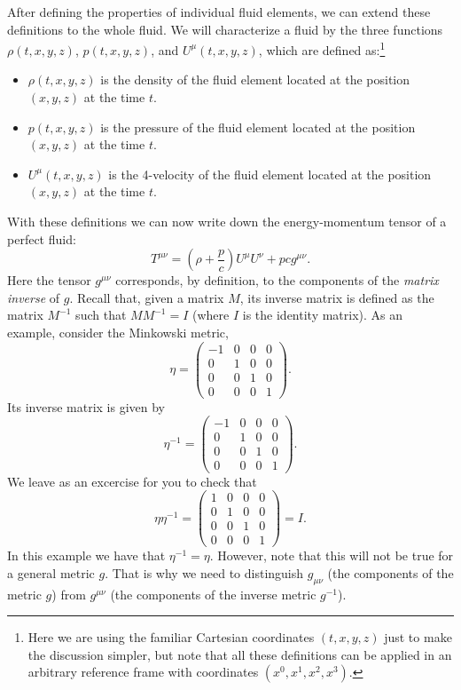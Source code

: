 After defining the properties of individual fluid elements, we can extend these definitions to the whole fluid. We will characterize a fluid by the three functions $\rho(t,x,y,z)$, $p(t,x,y,z)$, and $U^{\mu}(t,x,y,z)$, which are defined as:\footnote{Here we are using the familiar Cartesian coordinates $(t,x,y,z)$ just to make the discussion simpler, but note that all these definitions can be applied in an arbitrary reference frame with coordinates $(x^0,x^1,x^2,x^3)$.}
\begin{itemize}
\item $\rho(t,x,y,z)$ is the density of the fluid element located at the position $(x,y,z)$ at the time $t$.
\item $p(t,x,y,z)$ is the pressure of the fluid element located at the position $(x,y,z)$ at the time $t$.
\item $U^{\mu}(t,x,y,z)$ is the 4-velocity of the fluid element located at the position $(x,y,z)$ at the time $t$.
\end{itemize}
With these definitions we can now write down the energy-momentum tensor of a perfect fluid:
\begin{equation} \label{eq:perfect_fluid_tmunu}
T^{\mu\nu}=\left(\rho+\frac{p}{c}\right)U^{\mu}U^{\nu}+pcg^{\mu\nu}.
\end{equation}
Here the tensor $g^{\mu\nu}$ corresponds, by definition, to the components of the {\it matrix inverse} of $g$. Recall that, given a matrix $M$, its inverse matrix is defined as the matrix $M^{-1}$ such that $MM^{-1}=I$ (where $I$ is the identity matrix). As an example, consider the Minkowski metric,
\begin{equation}
\eta=\left( \begin{array}{cccc} -1 & 0 & 0 & 0 \\ 
0 & 1 & 0 & 0 \\
0 & 0 & 1 & 0 \\
0 & 0 & 0 & 1\end{array} \right).
\end{equation}
Its inverse matrix is given by
\begin{equation}
\eta^{-1}=\left( \begin{array}{cccc} -1 & 0 & 0 & 0 \\ 
0 & 1 & 0 & 0 \\
0 & 0 & 1 & 0 \\
0 & 0 & 0 & 1\end{array} \right).
\end{equation}
We leave as an excercise for you to check that
\begin{equation}
\eta\eta^{-1}=\left( \begin{array}{cccc} 1 & 0 & 0 & 0 \\ 
0 & 1 & 0 & 0 \\
0 & 0 & 1 & 0 \\
0 & 0 & 0 & 1\end{array} \right)=I.
\end{equation}
In this example we have that $\eta^{-1}=\eta$. However, note that this will not be true for a general metric $g$. That is why we need to distinguish $g_{\mu\nu}$ (the components of the metric $g$) from $g^{\mu\nu}$ (the components of the inverse metric $g^{-1}$).

